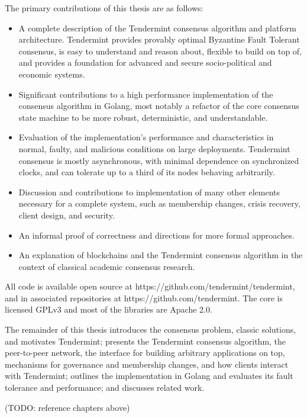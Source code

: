 The primary contributions of this thesis are as follows:


\begin{itemize}  

    \item A complete description of the Tendermint consensus algorithm and platform architecture. Tendermint provides provably optimal Byzantine Fault Tolerant consensus, is easy to understand and reason about, flexible to build on top of, and provides a foundation for advanced and secure socio-political and economic systems. 

    \item Significant contributions to a high performance implementation of the consensus algorithm in Golang, most notably a refactor of the core consensus state machine to be more robust, deterministic, and understandable.

    \item Evaluation of the implementation's performance and characteristics in normal, faulty, and malicious conditions on large deployments. Tendermint consensus is mostly asynchronous, with minimal dependence on synchronized clocks, and can tolerate up to a third of its nodes behaving arbitrarily. 

    \item Discussion and contributions to implementation of many other elements necessary for a complete system, such as membership changes, crisis recovery, client design, and security.

    \item An informal proof of correctness and directions for more formal approaches.

    \item An explanation of blockchains and the Tendermint consensus algorithm in the context of classical academic consensus research.
\end{itemize}

All code is available open source at https://github.com/tendermint/tendermint, and in associated repositories at https://github.com/tendermint. 
The core is licensed GPLv3 and most of the libraries are Apache 2.0.

The remainder of this thesis introduces the consensus problem, classic solutions, and motivates Tendermint;
presents the Tendermint consensus algorithm, the peer-to-peer network, the interface for building arbitrary applications on top,  
mechanisms for governance and membership changes, and how clients interact with Tendermint;
outlines the implementation in Golang and evaluates its fault tolerance and performance;
and discusses related work.

(TODO: reference chapters above)
